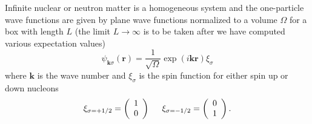Infinite nuclear or neutron matter is a homogeneous system and the
one-particle wave functions are given by plane wave functions
normalized to a volume $\Omega$ for a box with length $L$ (the limit
$L\rightarrow \infty$ is to be taken after we have computed various
expectation values)
\[
\psi_{\mathbf{k}\sigma}(\mathbf{r})= \frac{1}{\sqrt{\Omega}}\exp{(i\mathbf{kr})}\xi_{\sigma}
\]
where $\mathbf{k}$ is the wave number and  $\xi_{\sigma}$ is the spin function for either spin up or down nucleons
\[ 
\xi_{\sigma=+1/2}=\left(\begin{array}{c} 1 \\ 0 \end{array}\right) \hspace{0.5cm}
\xi_{\sigma=-1/2}=\left(\begin{array}{c} 0 \\ 1 \end{array}\right).
\]

